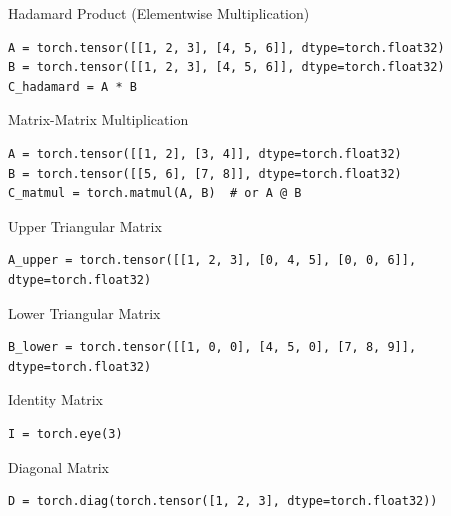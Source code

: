 \documentclass[aspectratio=169,xcolor=dvipsnames,svgnames,x11names,fleqn]{beamer}
\begin{document}
\begin{frame}[containsverbatim]{Hadamard Product (Elementwise Multiplication)}
\begin{verbatim}
A = torch.tensor([[1, 2, 3], [4, 5, 6]], dtype=torch.float32)
B = torch.tensor([[1, 2, 3], [4, 5, 6]], dtype=torch.float32)
C_hadamard = A * B
\end{verbatim}
\end{frame}


\begin{frame}[containsverbatim]{Matrix-Matrix Multiplication}
\begin{verbatim}
A = torch.tensor([[1, 2], [3, 4]], dtype=torch.float32)
B = torch.tensor([[5, 6], [7, 8]], dtype=torch.float32)
C_matmul = torch.matmul(A, B)  # or A @ B
\end{verbatim}
\end{frame}

\begin{frame}[containsverbatim]{Upper Triangular Matrix}
\begin{verbatim}
A_upper = torch.tensor([[1, 2, 3], [0, 4, 5], [0, 0, 6]], dtype=torch.float32)
\end{verbatim}
\end{frame}


\begin{frame}[containsverbatim]{Lower Triangular Matrix}
\begin{verbatim}
B_lower = torch.tensor([[1, 0, 0], [4, 5, 0], [7, 8, 9]], dtype=torch.float32)
\end{verbatim}
\end{frame}

\begin{frame}[containsverbatim]{Identity Matrix}
\begin{verbatim}
I = torch.eye(3)
\end{verbatim}
\end{frame}

\begin{frame}[containsverbatim]{Diagonal Matrix}
\begin{verbatim}
D = torch.diag(torch.tensor([1, 2, 3], dtype=torch.float32))
\end{verbatim}
\end{frame}
\end{document}
